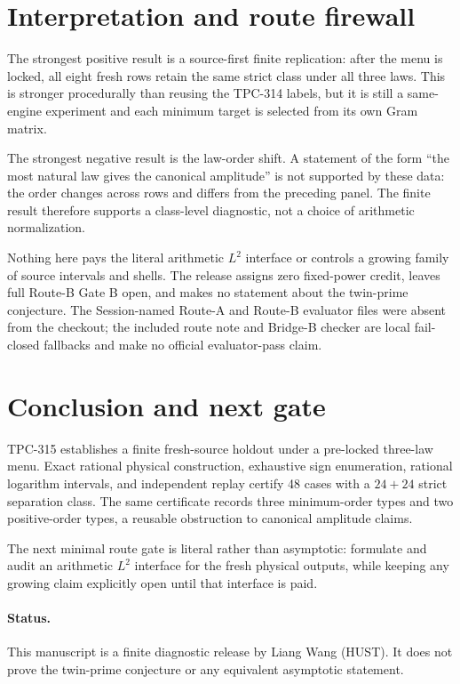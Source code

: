 \documentclass[10pt,a4paper]{article}
\begin{document}
\section{Interpretation and route firewall}

The strongest positive result is a source-first finite replication: after the
menu is locked, all eight fresh rows retain the same strict class under all
three laws.  This is stronger procedurally than reusing the TPC-314 labels,
but it is still a same-engine experiment and each minimum target is selected
from its own Gram matrix.

The strongest negative result is the law-order shift.  A statement of the
form ``the most natural law gives the canonical amplitude'' is not supported
by these data: the order changes across rows and differs from the preceding
panel.  The finite result therefore supports a class-level diagnostic, not a
choice of arithmetic normalization.

Nothing here pays the literal arithmetic $L^2$ interface or controls a
growing family of source intervals and shells.  The release assigns zero
fixed-power credit, leaves full Route-B Gate B open, and makes no statement
about the twin-prime conjecture.  The Session-named Route-A and Route-B
evaluator files were absent from the checkout; the included route note and
Bridge-B checker are local fail-closed fallbacks and make no official
evaluator-pass claim.

\section{Conclusion and next gate}

TPC-315 establishes a finite fresh-source holdout under a pre-locked
three-law menu.  Exact rational physical construction, exhaustive sign
enumeration, rational logarithm intervals, and independent replay certify 48
cases with a $24+24$ strict separation class.  The same certificate records
three minimum-order types and two positive-order types, a reusable obstruction
to canonical amplitude claims.

The next minimal route gate is literal rather than asymptotic: formulate and
audit an arithmetic $L^2$ interface for the fresh physical outputs, while
keeping any growing claim explicitly open until that interface is paid.

\paragraph{Status.}
This manuscript is a finite diagnostic release by Liang Wang (HUST).  It does
not prove the twin-prime conjecture or any equivalent asymptotic statement.


\begingroup\small

\endgroup
\end{document}
